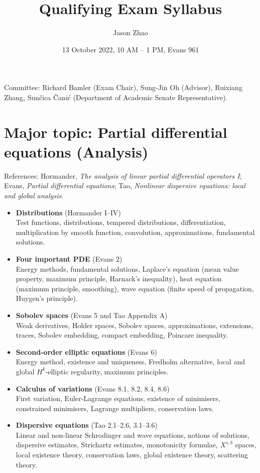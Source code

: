 \documentclass[11pt]{article}
\title{Qualifying Exam Syllabus}
\author{Jason Zhao}
\date{13 October 2022, 10 AM -- 1 PM, Evans 961}
\begin{document}
\maketitle

Committee:  Richard Bamler (Exam Chair), Sung-Jin Oh (Advisor), Ruixiang Zhang, Sunčica Čanić
 (Department of Academic Senate Representative).

\section{Major topic:  Partial differential equations (Analysis)}

References: Hormander, \textit{The analysis of linear partial differential operators I}; Evans, \textit{Partial differential equations}; Tao, \textit{Nonlinear dispersive equations: local and global analysis}. 
\begin{itemize}
\item \textbf{Distributions} (Hormander I--IV)\\
Test functions, distributions, tempered distributions, differentiation, multiplication by smooth function, convolution, approximations, fundamental solutions. 

\item \textbf{Four important PDE} (Evans 2) \\
Energy methods, fundamental solutions, Laplace's equation (mean value property, maximum principle, Harnack's inequality), heat equation (maximum principle, smoothing), wave equation (finite speed of propagation, Huygen's principle).

\item \textbf{Sobolev spaces} (Evans 5 and Tao Appendix A) \\
Weak derivatives, Holder spaces, Sobolev spaces, approximations, extensions, traces, Sobolev embedding, compact embedding, Poincare inequality.

\item \textbf{Second-order elliptic equations} (Evans 6) \\
Energy method, existence and uniqueness, Fredholm alternative, local and global $H^k$-elliptic regularity, maximum principles. 

\item \textbf{Calculus of variations} (Evans 8.1, 8.2, 8.4, 8.6) \\
First variation, Euler-Lagrange equations, existence of minimisers, constrained minimisers, Lagrange multipliers, conservation laws. 


\item \textbf{Dispersive equations} (Tao 2.1--2.6, 3.1--3.6) \\
Linear and non-linear Schrodinger and wave equations, notions of solutions, dispersive estimates, Strichartz estimates, monotonicity formulae, $X^{s, b}$ spaces, local existence theory, conservation laws, global existence theory, scattering theory. 
\end{itemize}
\end{document}
